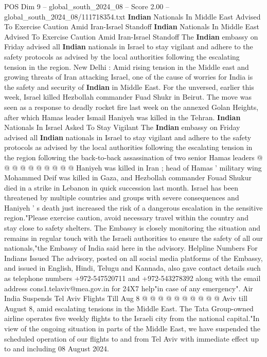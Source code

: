 \begin{textsample}{POS Dim 9 – global\_south\_2024\_08 – Score 2.00 – global\_south\_2024\_08/111718354.txt}  \label{ex:f9_pos_056}
\textbf{Indian} Nationals In Middle East Advised To Exercise Caution Amid Iran-Israel Standoff \textbf{Indian} Nationals In Middle East Advised To Exercise Caution Amid Iran-Israel Standoff The \textbf{Indian} embassy on Friday advised all \textbf{Indian} nationals in Israel to stay vigilant and adhere to the safety protocols as advised by the local authorities following the escalating tension in the region.
New Delhi : Amid rising tension in the Middle east and growing threats of Iran attacking Israel, one of the cause of worries for India is the safety and security of \textbf{Indian} in Middle East.
For the unversed, earlier this week, Israel killed Hezbollah commander Fuad Shukr in Beirut.
The move was seen as a response to deadly rocket fire last week on the annexed Golan Heights, after which Hamas leader Ismail Haniyeh was killed in the Tehran. \textbf{Indian} Nationals In Israel Asked To Stay Vigilant The \textbf{Indian} embassy on Friday advised all \textbf{Indian} nationals in Israel to stay vigilant and adhere to the safety protocols as advised by the local authorities following the escalating tension in the region following the back-to-back assassination of two senior Hamas leaders @ @ @ @ @ @ @ @ @ @ Haniyeh was killed in Iran ; head of Hamas ' military wing Mohammed Deif was killed in Gaza, and Hezbollah commander Fouad Shukur died in a strike in Lebanon in quick succession last month.
Israel has been threatened by multiple countries and groups with severe consequences and Haniyeh ' s death just increased the risk of a dangerous escalation in the sensitive region."Please exercise caution, avoid necessary travel within the country and stay close to safety shelters.
The Embassy is closely monitoring the situation and remains in regular touch with the Israeli authorities to ensure the safety of all our nationals,"the Embassy of India said here in the advisory.
Helpline Numbers For Indians Issued The advisory, posted on all social media platforms of the Embassy, and issued in English, Hindi, Telugu and Kannada, also gave contact details such as telephone numbers +972-547520711 and +972-543278392 along with the email address cons1.telaviv@mea.gov.in for 24X7 help"in case of any emergency".
Air India Suspends Tel Aviv Flights Till Aug 8 @ @ @ @ @ @ @ @ @ @ Aviv till August 8, amid escalating tensions in the Middle East.
The Tata Group-owned airline operates five weekly flights to the Israeli city from the national capital."In view of the ongoing situation in parts of the Middle East, we have suspended the scheduled operation of our flights to and from Tel Aviv with immediate effect up to and including 08 August 2024.

\end{textsample}
